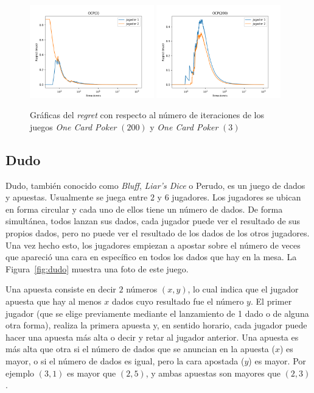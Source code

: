 \begin{figure}[h]
    \centering
    \includegraphics[width=0.48\textwidth]{graficas/cfr/ocp/OCP(3).png}
    \includegraphics[width=0.48\textwidth]{graficas/cfr/ocp/OCP(200).png}
    \caption{Gráficas del \textit{regret} con respecto al número de iteraciones de los juegos \textit{One Card Poker} $(200)$ y \textit{One Card Poker} $(3)$}
    \label{fig:cfr-regret-ocp-200}
\end{figure}

\subsection*{Dudo}
Dudo, también conocido como \textit{Bluff}, \textit{Liar's Dice} o Perudo, es un juego de dados y apuestas. Usualmente se juega entre $2$ y $6$ jugadores. Los jugadores se ubican en forma circular y cada uno de ellos tiene un número de dados. De forma simultánea, todos lanzan sus dados, cada jugador puede ver el resultado de sus propios dados, pero no puede ver el resultado de los dados de los otros jugadores. Una vez hecho esto, los jugadores empiezan a apostar sobre el número de veces que apareció una cara en específico en todos los dados que hay en la mesa.  La Figura~\ref{fig:dudo} muestra una foto de este juego.

Una apuesta consiste en decir $2$ números $(x, y)$, lo cual indica que el jugador apuesta que hay al menos $x$ dados cuyo resultado fue el número $y$. El primer jugador (que se elige previamente mediante el lanzamiento de 1 dado o de alguna otra forma), realiza la primera apuesta y, en sentido horario, cada jugador puede hacer una apuesta más alta o decir  y retar al jugador anterior. Una apuesta es más alta que otra si el número de dados que se anuncian en la apuesta ($x$) es mayor, o si el número de dados es igual, pero la cara apostada ($y$) es mayor. Por ejemplo $(3, 1)$ es mayor que $(2, 5)$, y ambas apuestas son mayores que $(2, 3)$.

